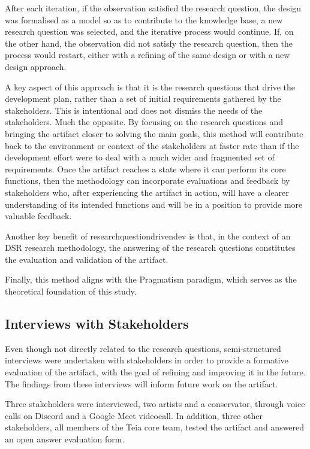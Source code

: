 After each iteration, if the observation satisfied the research question, the design was formalised as a model so as to contribute to the knowledge base, a new research question was selected, and the iterative process would continue. If, on the other hand, the observation did not satisfy the research question, then the process would restart, either with a refining of the same design or with a new design approach.

A key aspect of this approach is that it is the research questions that drive the development plan, rather than a set of initial requirements gathered by the stakeholders. This is intentional and does not dismiss the needs of the stakeholders. Much the opposite. By focusing on the research questions and bringing the artifact closer to solving the main goals, this method will contribute back to the environment or context of the stakeholders at faster rate than if the development effort were to deal with a much wider and fragmented set of requirements. Once the artifact reaches a state where it can perform its core functions, then the methodology can incorporate evaluations and feedback by stakeholders who, after experiencing the artifact in action, will have a clearer understanding of its intended functions and will be in a position to provide more valuable feedback.

Another key benefit of \gls{researchquestiondrivendev} is that, in the context of an DSR research methodology, the answering of the research questions constitutes the evaluation and validation of the artifact.

Finally, this method aligns with the Pragmatism paradigm, which serves as the theoretical foundation of this study.


\subsection{Interviews with Stakeholders}

Even though not directly related to the research questions, semi-structured interviews were undertaken with stakeholders in order to provide a formative evaluation of the artifact, with the goal of refining and improving it in the future. The findings from these interviews will inform future work on the artifact.

Three stakeholders were interviewed, two artists and a conservator, through voice calls on Discord and a Google Meet videocall.
In addition, three other stakeholders, all members of the Teia core team, tested the artifact and answered an open answer evaluation form.

